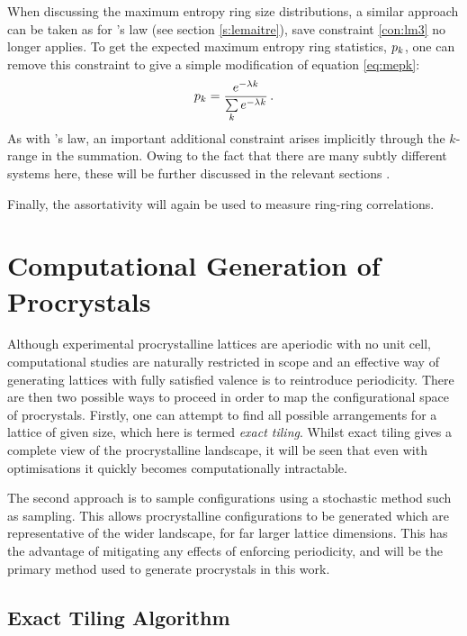 When discussing the maximum entropy ring size distributions, a similar approach can be taken as for \lm's law (see section \ref{s:lemaitre}), save constraint \eqref{con:lm3} no longer applies.
To get the expected maximum entropy ring statistics, $p_k$, one can remove this constraint to give a simple modification of equation \eqref{eq:mepk}:
\begin{equation}
	\label{eq:prome}
    p_k = \frac{e^{-\lambda k}}{\sum\limits_k e^{-\lambda k}}\,.
\end{equation}
As with \lm's law, an important additional constraint arises implicitly through the $k$\--range in the summation.
Owing to the fact that there are many subtly different systems here, these will be further discussed in the relevant sections .

Finally, the assortativity will again be used to measure ring\--ring correlations.

\section{Computational Generation of Procrystals}

Although experimental procrystalline lattices are aperiodic with no unit cell, computational studies are naturally restricted in scope and an effective way of generating lattices with fully satisfied valence is to reintroduce periodicity. 
There are then two possible ways to proceed in order to map the configurational space of procrystals.
Firstly, one can attempt to find all possible arrangements for a lattice of given size, which here is termed \textit{exact tiling}.
Whilst exact tiling gives a complete view of the procrystalline landscape, it will be seen that even with optimisations it quickly becomes computationally intractable.

The second approach is to sample configurations using a stochastic method such as \mc{} sampling.
This allows procrystalline configurations to be generated which are representative of the wider landscape, for far larger lattice dimensions.
This has the advantage of mitigating any effects of enforcing periodicity, and will be the primary method used to generate procrystals in this work.

\subsection{Exact Tiling Algorithm}


